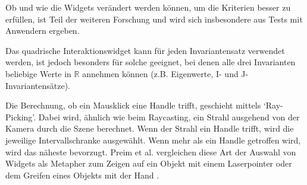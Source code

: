 \documentclass[a4paper,fontsize=12pt,toc=bib,halfparskip]{scrartcl}
\begin{document}
Ob und wie die Widgets ver\"andert werden k\"onnen, um die Kriterien besser zu erf\"ullen, ist Teil der weiteren Forschung und wird sich insbesondere aus Tests mit Anwendern ergeben.

Das quadrische Interaktionswidget kann f\"ur jeden Invariantensatz verwendet werden, ist jedoch besonders f\"ur solche geeignet, bei denen alle drei Invarianten beliebige Werte in $\mathbb{R}$ annehmen k\"onnen (z.B. Eigenwerte, I- und J-Invariantens\"atze).

Die Berechnung, ob ein Mausklick eine Handle trifft, geschieht mittels `Ray-Picking'. Dabei wird, \"ahnlich wie beim Raycasting, ein Strahl ausgehend von der Kamera durch die Szene berechnet. Wenn der Strahl ein Handle trifft, wird die jeweilige Intervallschranke ausgew\"ahlt.  Wenn mehr als ein Handle getroffen wird, wird das n\"aheste bevorzugt. Preim et al. vergleichen diese Art der Auswahl von Widgets als Metapher zum Zeigen auf ein Objekt mit einem Laserpointer oder dem Greifen eines Objekts mit der Hand \cite[344]{preim2015interaktive}.
\end{document}
